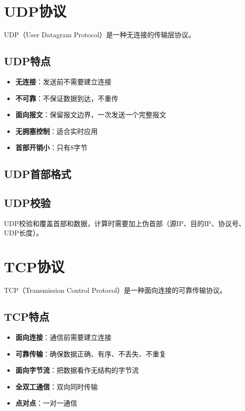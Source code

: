 \section{UDP协议}
UDP（User Datagram Protocol）是一种无连接的传输层协议。

\subsection{UDP特点}
\begin{itemize}[leftmargin=2em,itemsep=0pt]
    \item \textbf{无连接}：发送前不需要建立连接
    \item \textbf{不可靠}：不保证数据到达，不重传
    \item \textbf{面向报文}：保留报文边界，一次发送一个完整报文
    \item \textbf{无拥塞控制}：适合实时应用
    \item \textbf{首部开销小}：只有8字节
\end{itemize}

\subsection{UDP首部格式}
\begin{center}
\end{center}

\subsection{UDP校验}
UDP校验和覆盖首部和数据，计算时需要加上伪首部（源IP、目的IP、协议号、UDP长度）。

\section{TCP协议}
TCP（Transmission Control Protocol）是一种面向连接的可靠传输协议。

\subsection{TCP特点}
\begin{itemize}[leftmargin=2em,itemsep=0pt]
    \item \textbf{面向连接}：通信前需要建立连接
    \item \textbf{可靠传输}：确保数据正确、有序、不丢失、不重复
    \item \textbf{面向字节流}：把数据看作无结构的字节流
    \item \textbf{全双工通信}：双向同时传输
    \item \textbf{点对点}：一对一通信
\end{itemize}

